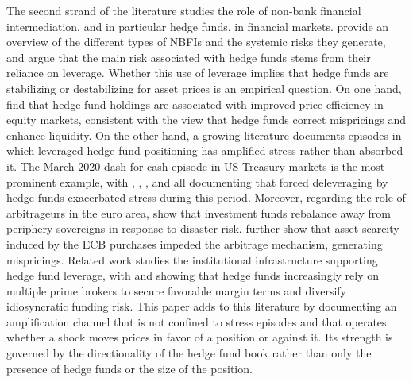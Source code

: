 \documentclass[english, 11pt, oneside]{article}
\begin{document}
The second strand of the literature studies the role of non-bank financial intermediation, and in particular hedge funds, in financial markets. \citet{aramonte2023} provide an overview of the different types of NBFIs and the systemic risks they generate, and argue that the main risk associated with hedge funds stems from their reliance on leverage. Whether this use of leverage implies that hedge funds are stabilizing or destabilizing for asset prices is an empirical question. On one hand, \citet{cao2018} find that hedge fund holdings are associated with improved price efficiency in equity markets, consistent with the view that hedge funds correct mispricings and enhance liquidity. On the other hand, a growing literature documents episodes in which leveraged hedge fund positioning has amplified stress rather than absorbed it. The March 2020 dash-for-cash episode in US Treasury markets is the most prominent example, with \citet{barth2025}, \citet{kruttli2025}, \citet{kashyap2025}, and \citet{barone2023} all documenting that forced deleveraging by hedge funds exacerbated stress during this period. Moreover, regarding the role of arbitrageurs in the euro area, \citet{anaya2025} show that investment funds rebalance away from periphery sovereigns in response to disaster risk. \citet{pelizzon2025} further show that asset scarcity induced by the ECB purchases impeded the arbitrage mechanism, generating mispricings. Related work studies the institutional infrastructure supporting hedge fund leverage, with \citet{dahlquist2023} and \citet{bittner2025} showing that hedge funds increasingly rely on multiple prime brokers to secure favorable margin terms and diversify idiosyncratic funding risk. This paper adds to this literature by documenting an amplification channel that is not confined to stress episodes and that operates whether a shock moves prices in favor of a position or against it. Its strength is governed by the directionality of the hedge fund book rather than only the presence of hedge funds or the size of the position.
\end{document}
